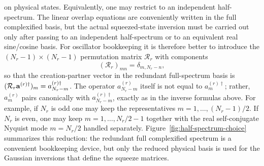 \documentclass[11pt]{article}
\numberwithin{equation}{section}
\begin{document}
on physical states. Equivalently, one may restrict to an independent half-spectrum. The linear overlap equations are conveniently written in the full complexified basis, but the actual squeezed-state inversion must be carried out only after passing to an independent half-spectrum or to an equivalent real sine/cosine basis.
For oscillator bookkeeping it is therefore better to introduce the $(N_r-1)\times(N_r-1)$ permutation matrix $\mathcal R_r$ with components
\begin{equation}
\label{eq:s10-024}
(\mathcal R_r)_{mn}=\delta_{m,N_r-n},
\end{equation}
so that the creation-partner vector in the redundant full-spectrum basis is $(\mathcal R_r{\bf a}^{(r)\dagger})_m=a_{N_r-m}^{(r)\dagger}$. The operator $a_{N_r-m}^{(r)}$ itself is not equal to $a_m^{(r)\dagger}$; rather, $a_m^{(r)}$ pairs canonically with $a_{N_r-m}^{(r)\dagger}$, exactly as in the inverse formulas above.
For example, if $N_r$ is odd one may keep the representatives $m=1,\dots,(N_r-1)/2$. If $N_r$ is even, one may keep $m=1,\dots,N_r/2-1$ together with the real self-conjugate Nyquist mode $m=N_r/2$ handled separately.
Figure~\ref{fig:half-spectrum-choice} summarizes this reduction: the redundant full complexified spectrum is a convenient bookkeeping device, but only the reduced physical basis is used for the Gaussian inversions that define the squeeze matrices.
\end{document}
